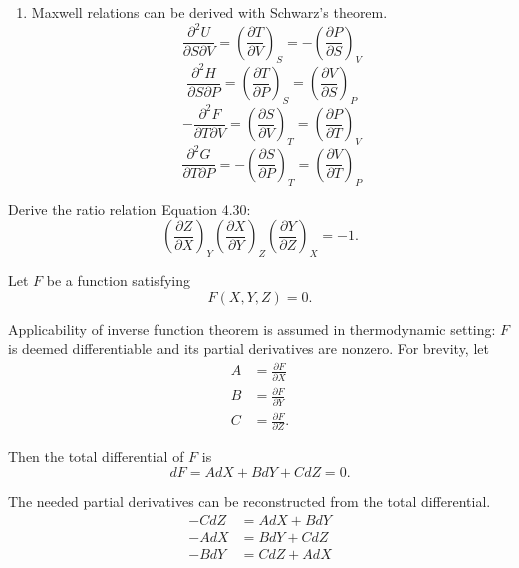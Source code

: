 \begin{@empty}
\begin{answer}
\begin{enumerate}
        \item Maxwell relations can be derived with Schwarz's theorem.
            \[
                \frac{\partial^2 U}{\partial S \partial V}
                = \left( \frac{\partial T}{\partial V} \right)_S
                = -\left( \frac{\partial P}{\partial S} \right)_V
            \]
            \[
                \frac{\partial^2 H}{\partial S \partial P}
                = \left( \frac{\partial T}{\partial P} \right)_S
                = \left( \frac{\partial V}{\partial S} \right)_P
            \]
            \[
                -\frac{\partial^2 F}{\partial T \partial V}
                = \left( \frac{\partial S}{\partial V} \right)_T
                = \left( \frac{\partial P}{\partial T} \right)_V
            \]
            \[
                \frac{\partial^2 G}{\partial T \partial P}
                = -\left( \frac{\partial S}{\partial P} \right)_T
                = \left( \frac{\partial V}{\partial T} \right)_P
            \]
    \end{enumerate}
\end{answer}

\begin{problem}
    Derive the ratio relation Equation 4.30:
    \[
        \left( \frac{\partial Z}{\partial X} \right)_Y
        \left( \frac{\partial X}{\partial Y} \right)_Z
        \left( \frac{\partial Y}{\partial Z} \right)_X
        = -1.
    \]
\end{problem}

\begin{answer}
    Let $F$ be a function satisfying
    \[ F(X, Y, Z) = 0.\]

    Applicability of inverse function theorem is assumed in thermodynamic
    setting: $F$ is deemed differentiable and its partial derivatives are
    nonzero.  For brevity, let
    \begin{align*}
        A &= \frac{\partial F}{\partial X} \\
        B &= \frac{\partial F}{\partial Y} \\
        C &= \frac{\partial F}{\partial Z}.
    \end{align*}

    Then the total differential of $F$ is
    \[ dF = AdX + BdY + CdZ = 0.\]

    The needed partial derivatives can be reconstructed from the total
    differential.
    \begin{align*}
        -CdZ &= AdX + BdY \\
        -AdX &= BdY + CdZ \\
        -BdY &= CdZ + AdX
    \end{align*}


\end{answer}
\end{@empty}
